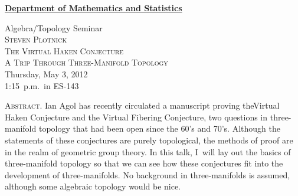 \documentclass[12pt]{article}
\begin{document}
\noindent\hspace{-28pt}\raisebox{-19pt}{\XeTeXpicfile UAlogo.jpg scaled 340}%
\hfill\textsf{\textbf{\footnotesize\href{http://www.albany.edu/math/}{Department of Mathematics and Statistics}}}\bigskip\bigskip

\begin{center}\Large
  \textsf{\huge Algebra/Topology Seminar}\\[2.5\bigskipamount]
  \textsc{\LARGE Steven Plotnick}\\[1.5\bigskipamount]
  \textsc{\LARGE The Virtual Haken Conjecture}\\
  \textsc{A Trip Through Three-Manifold Topology}\\[2\bigskipamount]
  Thursday, May 3, 2012\\1:15~p.m.\ in ES-143\\[3\bigskipamount]
\end{center}

\noindent\large\textsc{Abstract.}
Ian Agol has recently circulated a manuscript proving the\linebreak Virtual Haken Conjecture and the Virtual Fibering Conjecture, two questions in three-manifold topology that had been open since the 60’s and 70’s.\linebreak
Although the statements of these conjectures are purely topological, the methods of proof are in the realm of geometric group theory.
In this talk, I~will lay out the basics of three-manifold topology so that we can see how these conjectures fit into the development of three-manifolds.
No background in three-manifolds is assumed, although some algebraic topology would be nice.
\end{document}
